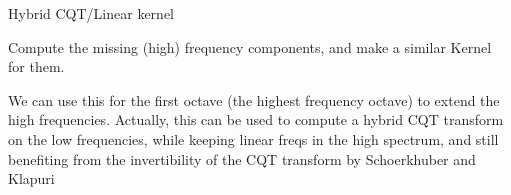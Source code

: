 \documentclass[letterpaper,10pt,english]{sphinxmanual}
\begin{document}
\begin{fulllineitems}
\label{reference/tftransforms:pyfasst.tftransforms.minqt.HybridCQTKernel}
Hybrid CQT/Linear kernel

\begin{fulllineitems}
\label{reference/tftransforms:pyfasst.tftransforms.minqt.HybridCQTKernel.computeMissingLinearFreqKernel}
Compute the missing (high) frequency
components, and make a similar Kernel for them.

We can use this for the first octave (the highest frequency octave)
to extend the high frequencies. Actually, this can be used to compute
a hybrid CQT transform on the low frequencies, while keeping linear
freqs in the high spectrum, and still benefiting from the invertibility
of the CQT transform by Schoerkhuber and Klapuri

\end{fulllineitems}


\end{fulllineitems}

\end{document}
